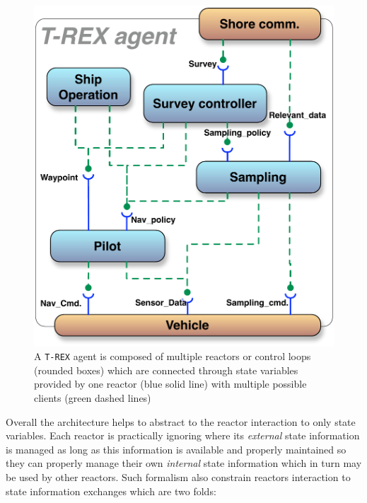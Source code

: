 \begin{figure}[!htb]
 \centering
 \includegraphics[scale=0.45]{figs/AUV-agent.pdf}
 \caption{\small A \texttt{T-REX} agent is composed of multiple
   reactors or control loops (rounded boxes) which are connected
   through state variables provided by one reactor ({\color{blue}blue}
   solid line) with multiple possible clients ({\color{green}green}
   dashed lines)}
  \label{fig:agent}
\end{figure}

Overall the \rx architecture helps to abstract to the reactor
interaction to only state variables. Each reactor is practically
ignoring where its {\em external} state information is managed as long
as this information is available and properly maintained so they can
properly manage their own {\em internal} state information which in
turn may be used by other reactors. Such formalism also constrain
reactors interaction to state information exchanges which are two
folds:

